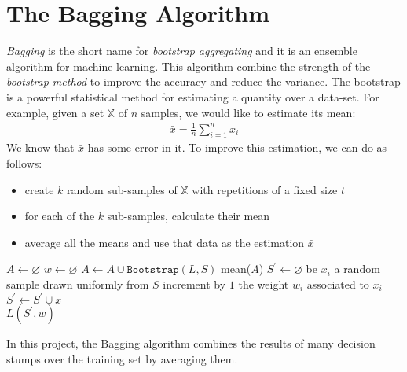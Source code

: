 
\chapter{The Bagging Algorithm}

\textit{Bagging} is the short name for \textit{bootstrap aggregating} and it is an ensemble algorithm for machine learning. This algorithm combine the strength of the \textit{bootstrap method} to improve the accuracy and reduce the variance. The bootstrap is a powerful statistical method for estimating a quantity over a data-set. For example, given a set $\mathbb{X}$ of $n$ samples, we would like to estimate its mean:
\begin{align*}
	\bar{x} = \frac{1}{n}\sum_{i=1}^{n}x_{i}
\end{align*}
We know that $\bar{x}$ has some error in it. To improve this estimation, we can do as follows:
\begin{itemize}
	\item create $k$ random sub-samples of $\mathbb{X}$ with repetitions of a fixed size $t$
	\item for each of the $k$ sub-samples, calculate their mean
	\item average all the means and use that data as the estimation $\bar{x}$
\end{itemize}
\begin{algorithm}[htpb]
	\caption{}
	\label{alg:bagging}
	\begin{algorithmic}[1]
		\State $A \gets \varnothing$
		\State $w \gets \varnothing$
		\State $A \gets A \cup \texttt{Bootstrap}(L,S)$
		\EndFor
		\Return mean($A$)
		\EndProcedure
		\State $S^{\prime} \gets \varnothing$
		\State be $x_{i}$ a random sample drawn uniformly from $S$
		\State increment by $1$ the weight $w_{i}$ associated to $x_{i}$
		\State $S^{\prime} \gets S^{\prime} \cup x$
		\EndFor
		\\
		\Return $L(S^{\prime}, w)$
		\EndProcedure
	\end{algorithmic}
\end{algorithm}
In this project, the Bagging algorithm combines the results of many decision stumps over the training set by averaging them.
